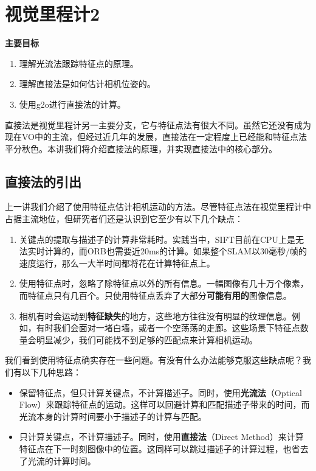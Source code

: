 \chapter{视觉里程计2}
\label{cpt:vo2}
\begin{mdframed}  
	\textbf{主要目标}
	\begin{enumerate}[labelindent=0em,leftmargin=1.5em]
		\item 理解光流法跟踪特征点的原理。
		\item 理解直接法是如何估计相机位姿的。
		\item 使用g2o进行直接法的计算。
	\end{enumerate}
\end{mdframed}

直接法是视觉里程计另一主要分支，它与特征点法有很大不同。虽然它还没有成为现在VO中的主流，但经过近几年的发展，直接法在一定程度上已经能和特征点法平分秋色。本讲我们将介绍直接法的原理，并实现直接法中的核心部分。

\newpage


\newpage
\section{直接法的引出}
上一讲我们介绍了使用特征点估计相机运动的方法。尽管特征点法在视觉里程计中占据主流地位，但研究者们还是认识到它至少有以下几个缺点：

\begin{enumerate}
	\item 关键点的提取与描述子的计算非常耗时。实践当中，SIFT目前在CPU上是无法实时计算的，而ORB也需要近20ms的计算。如果整个SLAM以30毫秒/帧的速度运行，那么一大半时间都将花在计算特征点上。
	
	\item 使用特征点时，忽略了除特征点以外的所有信息。一幅图像有几十万个像素，而特征点只有几百个。只使用特征点丢弃了大部分\textbf{可能有用的}图像信息。
	
	\item 相机有时会运动到\textbf{特征缺失}的地方，这些地方往往没有明显的纹理信息。例如，有时我们会面对一堵白墙，或者一个空荡荡的走廊。这些场景下特征点数量会明显减少，我们可能找不到足够的匹配点来计算相机运动。 
\end{enumerate}

我们看到使用特征点确实存在一些问题。有没有什么办法能够克服这些缺点呢？我们有以下几种思路：

\begin{itemize}
	\item 保留特征点，但只计算关键点，不计算描述子。同时，使用\textbf{光流法}（Optical Flow）来跟踪特征点的运动。这样可以回避计算和匹配描述子带来的时间，而光流本身的计算时间要小于描述子的计算与匹配。
	\item 只计算关键点，不计算描述子。同时，使用\textbf{直接法}（Direct Method）来计算特征点在下一时刻图像中的位置。这同样可以跳过描述子的计算过程，也省去了光流的计算时间。
\end{itemize}

